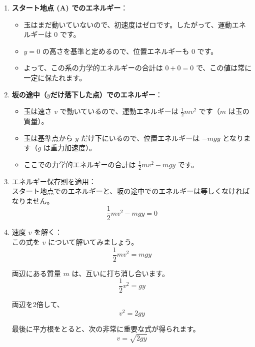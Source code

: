 \documentclass[a4paper,12pt]{bxjsarticle}
\begin{document}
\begin{enumerate}
\item \textbf{スタート地点 (A) でのエネルギー}：
\begin{itemize}
\item 玉はまだ動いていないので、初速度はゼロです。したがって、運動エネルギーは $0$ です。
\item $y=0$ の高さを基準と定めるので、位置エネルギーも $0$ です。
\item よって、この系の力学的エネルギーの合計は $0+0=0$ で、この値は常に一定に保たれます。
\end{itemize}

\item \textbf{坂の途中（$y$だけ落下した点）でのエネルギー}：
\begin{itemize}
\item 玉は速さ $v$ で動いているので、運動エネルギーは $\frac{1}{2}mv^2$ です（$m$ は玉の質量）。
\item 玉は基準点から $y$ だけ下にいるので、位置エネルギーは $-mgy$ となります（$g$ は重力加速度）。
\item ここでの力学的エネルギーの合計は $\frac{1}{2}mv^2-mgy$ です。
\end{itemize}

\item エネルギー保存則を適用：\\
スタート地点でのエネルギーと、坂の途中でのエネルギーは等しくなければなりません。
\begin{equation}
\frac{1}{2}mv^2-mgy=0
\end{equation}

\item 速度 $v$ を解く：\\
この式を $v$ について解いてみましょう。
\begin{equation}
\frac{1}{2}mv^2=mgy
\end{equation}

両辺にある質量 $m$ は、互いに打ち消し合います。
\begin{equation}
\frac{1}{2}v^2=gy
\end{equation}

両辺を2倍して、
\begin{equation}
v^2=2gy
\end{equation}

最後に平方根をとると、次の非常に重要な式が得られます。
\begin{equation}
v=\sqrt{2gy}
\end{equation}
\end{enumerate}
\end{document}
